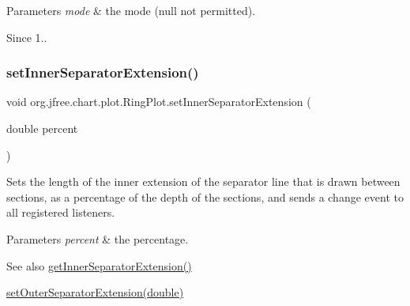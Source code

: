\begin{DoxyParams}{Parameters}
{\em mode} & the mode ({\ttfamily null} not permitted).\\
\hline
\end{DoxyParams}
\begin{DoxySince}{Since}
1.. 
\end{DoxySince}
\mbox{\label{classorg_1_1jfree_1_1chart_1_1plot_1_1_ring_plot_ad2e08a53e400d8fed0d516222276db69}} 
\subsubsection{\texorpdfstring{set\+Inner\+Separator\+Extension()}{setInnerSeparatorExtension()}}
{\footnotesize\ttfamily void org.\+jfree.\+chart.\+plot.\+Ring\+Plot.\+set\+Inner\+Separator\+Extension (\begin{DoxyParamCaption}\item[{double}]{percent }\end{DoxyParamCaption})}

Sets the length of the inner extension of the separator line that is drawn between sections, as a percentage of the depth of the sections, and sends a change event to all registered listeners.


\begin{DoxyParams}{Parameters}
{\em percent} & the percentage.\\
\hline
\end{DoxyParams}
\begin{DoxySeeAlso}{See also}
\mbox{\hyperlink{classorg_1_1jfree_1_1chart_1_1plot_1_1_ring_plot_af94bba1ac45b66d27c45ba268e0c63ee}{get\+Inner\+Separator\+Extension()}} 

\mbox{\hyperlink{classorg_1_1jfree_1_1chart_1_1plot_1_1_ring_plot_a72407832e42e6e9d804301a68e2c269e}{set\+Outer\+Separator\+Extension(double)}} 
\end{DoxySeeAlso}
\mbox{\label{classorg_1_1jfree_1_1chart_1_1plot_1_1_ring_plot_a72407832e42e6e9d804301a68e2c269e}} 
